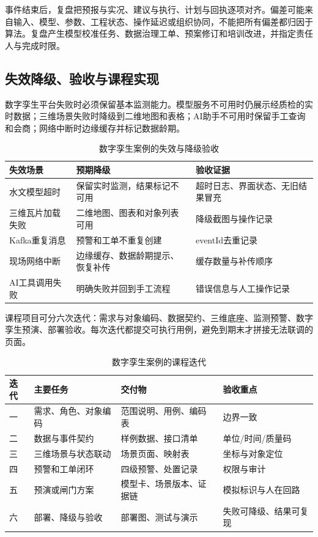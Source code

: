 事件结束后，复盘把预报与实况、建议与执行、计划与回执逐项对齐。偏差可能来自输入、模型、参数、工程状态、操作延迟或组织协同，不能把所有偏差都归因于算法。复盘产生模型校准任务、数据治理工单、预案修订和培训改进，并指定责任人与完成时限。

\subsection{失效降级、验收与课程实现}

数字孪生平台失败时必须保留基本监测能力。模型服务不可用时仍展示经质检的实时数据；三维场景失败时降级到二维地图和表格；AI助手不可用时保留手工查询和会商；网络中断时边缘缓存并标记数据龄期。

\begin{table}[htbp]
\centering
\caption{数字孪生案例的失效与降级验收}
\label{tab:twin-failure-acceptance}
\begin{tabular}{p{2.7cm}p{4.2cm}p{5.5cm}}
\toprule
失效场景 & 预期降级 & 验收证据 \\
\midrule
水文模型超时 & 保留实时监测，结果标记不可用 & 超时日志、界面状态、无旧结果冒充 \\
三维瓦片加载失败 & 二维地图、图表和对象列表可用 & 降级截图与操作记录 \\
Kafka重复消息 & 预警和工单不重复创建 & eventId去重记录 \\
现场网络中断 & 边缘缓存、数据龄期提示、恢复补传 & 缓存数量与补传顺序 \\
AI工具调用失败 & 明确失败并回到手工流程 & 错误信息与人工操作记录 \\
\bottomrule
\end{tabular}
\end{table}

课程项目可分六次迭代：需求与对象编码、数据契约、三维底座、监测预警、数字孪生预演、部署验收。每次迭代都提交可执行用例，避免到期末才拼接无法联调的页面。

\begin{table}[htbp]
\centering
\caption{数字孪生案例的课程迭代}
\label{tab:twin-course-iterations}
\begin{tabular}{p{1.4cm}p{3.7cm}p{4.3cm}p{3.4cm}}
\toprule
迭代 & 主要任务 & 交付物 & 验收重点 \\
\midrule
一 & 需求、角色、对象编码 & 范围说明、用例、编码表 & 边界一致 \\
二 & 数据与事件契约 & 样例数据、接口清单 & 单位/时间/质量码 \\
三 & 三维场景与状态联动 & 场景页面、映射表 & 坐标与对象定位 \\
四 & 预警和工单闭环 & 四级预警、处置记录 & 权限与审计 \\
五 & 预演或闸门方案 & 模型卡、场景版本、证据链 & 模拟标识与人在回路 \\
六 & 部署、降级与验收 & 部署图、测试与演示 & 失败可降级、结果可复现 \\
\bottomrule
\end{tabular}
\end{table}

